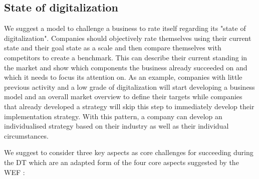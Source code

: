 \subsection{State of digitalization}
We suggest a model to challenge a business to rate itself regarding its "state of digitalization". Companies should objectively rate themselves using their current state and their goal state as a scale and then compare themselves with competitors to create a benchmark. This can describe their current standing in the market and show which components the business already succeeded on and which it needs to focus its attention on. As an example, companies with little previous activity and a low grade of digitalization will start developing a business model and an overall market overview to define their targets while companies that already developed a strategy will skip this step to immediately develop their implementation strategy. With this pattern, a company can develop an individualised strategy based on their industry as well as their individual circumstances.

We suggest to consider three key aspects as core challenges for succeeding during the \ac{DT} which are an adapted form of the four core aspects suggested by the \ac{WEF} \cite{worldforumdigitalenterprise:2016}:


